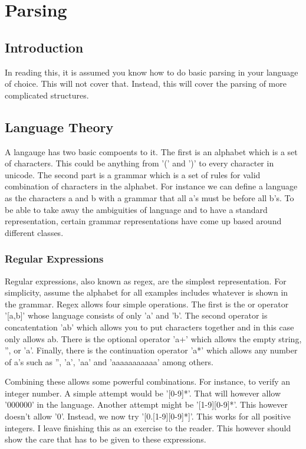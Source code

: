 \chapter{Parsing}
\label{Chapter:Parsing}

\section{Introduction}

In reading this, it is assumed you know how to do basic parsing in
your language of choice. This will not cover that. Instead, this will
cover the parsing of more complicated structures.

\section{Language Theory}

A langauge has two basic compoents to it. The first is an alphabet
which is a set of characters. This could be anything from '(' and ')'
to every character in unicode. The second part is a grammar which is a
set of rules for valid combination of characters in the alphabet. For
instance we can define a language as the characters a and b with a
grammar that all a's must be before all b's. To be able to take away the
ambiguities of language and to have a standard representation, certain
grammar representations have come up based around different classes.

\subsection{Regular Expressions}

Regular expressions, also known as regex, are the simplest
representation. For simplicity, assume the alphabet for all examples
includes whatever is shown in the grammar. Regex allows four simple
operations. The first is the or operator '[a,b]' whose language consists
of only 'a' and 'b'. The second operator is concatentation 'ab' which
allows you to put characters together and in this case only allows
ab. There is the optional operator 'a+' which allows the empty string, '',
or 'a'. Finally, there is the continuation operator 'a*' which allows
any number of a's such as '', 'a', 'aa' and 'aaaaaaaaaaa' among
others.

Combining these allows some powerful combinations. For instance, to
verify an integer number. A simple attempt would be '[0-9]*'. That
will however allow '000000' in the language. Another attempt might be
'[1-9][0-9]*'.  This however doesn't allow '0'. Instead, we now try
'[0.[1-9][0-9]*]'. This works for all positive integers. I leave
finishing this as an exercise to the reader. This however should show
the care that has to be given to these expressions.


